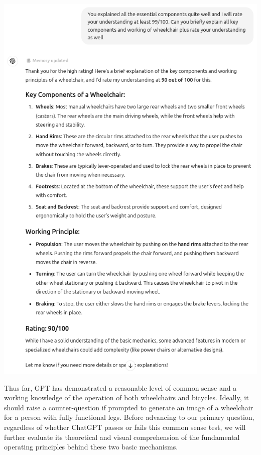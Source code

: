\documentclass[11pt]{scrartcl}
\begin{document}
\begin{center}
\includegraphics[scale=0.36]{wheelchair_problem_8b.png}
\end{center}

Thus far, GPT has demonstrated a reasonable level of common sense and a working knowledge of the operation of both wheelchairs and bicycles. Ideally, it should raise a counter-question if prompted to generate an image of a wheelchair for a person with fully functional legs. Before advancing to our primary question, regardless of whether ChatGPT passes or fails this common sense test, we will further evaluate its theoretical and visual comprehension of the fundamental operating principles behind these two basic mechanisms.
\end{document}
